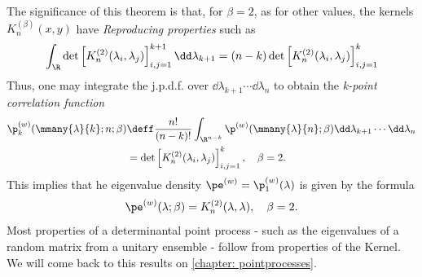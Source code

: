  
 The significance of this theorem is that, for $\beta = 2$, as for other values, the kernels $K_n^{(\beta)}(x,y)$ have \textit{Reproducing properties} such as
 \begin{equation}
 	\int_{\R} \det\left[ K_n^{(2)}(\lambda_i, \lambda_j) \right]_{i,j=1}^{k+1} \dd \lambda_{k+1} = (n-k) \det\left[ K_n^{(2)}(\lambda_i, \lambda_j) \right]_{i,j=1}^{k}
 \end{equation}
 Thus, one may integrate the j.p.d.f. over $\dd \lambda_{k+1} \cdots \dd \lambda_n$ to obtain the \textit{k-point correlation function}
 \begin{align}
 	\p_k^{(w)}(\mmany{\lambda}{k};n;\beta) & \deff \frac{n!}{(n-k)!} \int_{\R^{n-k}} \p^{(w)}(\mmany{\lambda}{n};\beta) \dd \lambda_{k+1} \cdots \dd \lambda_n \\
 	& = \det\left[ K_n^{(2)}(\lambda_i, \lambda_j) \right]_{i,j=1}^{k}, \quad \beta = 2.
 \end{align}
 This implies that he eigenvalue density $\pe^{(w)} = \p_1^{(w)}(\lambda)$ is given by the formula
 \begin{equation}
 	\pe^{(w)}(\lambda; \beta) = K_n^{(2)}(\lambda, \lambda), \quad \beta = 2.
 \end{equation}
 Most properties of a determinantal point process - such as the eigenvalues of a random matrix from a unitary ensemble - follow from properties of the Kernel.  We will come back to this results on \autoref{chapter: pointprocesses}. 

 